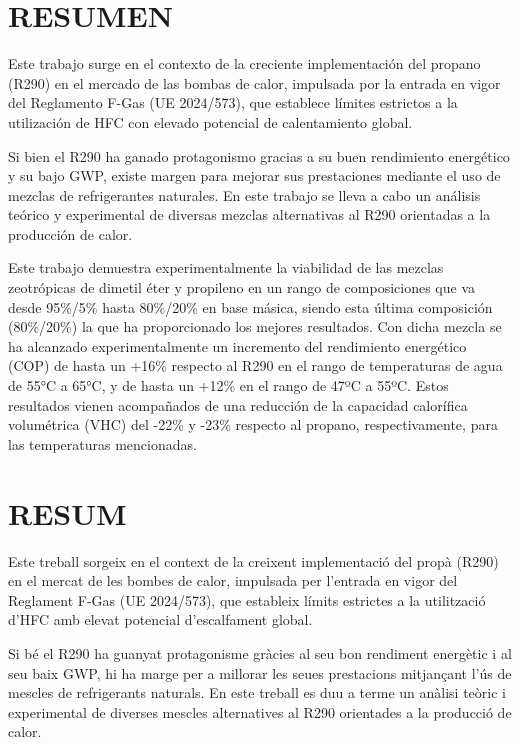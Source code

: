 \documentclass[../main.tex]{subfiles}
\begin{document}
\chapter*{RESUMEN}

Este trabajo surge en el contexto de la creciente implementación del propano (R290) en el mercado de las bombas de calor, impulsada por la entrada en vigor del Reglamento F-Gas (UE 2024/573), que establece límites estrictos a la utilización de HFC con elevado potencial de calentamiento global.

Si bien el R290 ha ganado protagonismo gracias a su buen rendimiento energético y su bajo GWP, existe margen para mejorar sus prestaciones mediante el uso de mezclas de refrigerantes naturales. En este trabajo se lleva a cabo un análisis teórico y experimental de diversas mezclas alternativas al R290 orientadas a la producción de calor.

Este trabajo demuestra experimentalmente la viabilidad de las mezclas zeotrópicas de dimetil éter y propileno en un rango de composiciones que va desde 95\%/5\% hasta 80\%/20\% en base másica, siendo esta última composición (80\%/20\%) la que ha proporcionado los mejores resultados. Con dicha mezcla se ha alcanzado experimentalmente un incremento del rendimiento energético (COP) de hasta un +16\% respecto al R290 en el rango de temperaturas de agua de 55°C a 65°C, y de hasta un +12\% en el rango de 47ºC a 55ºC. Estos resultados vienen acompañados de una reducción de la capacidad calorífica volumétrica (VHC) del -22\% y -23\% respecto al propano, respectivamente, para las temperaturas mencionadas.

\chapter*{RESUM}

Este treball sorgeix en el context de la creixent implementació del propà (R290) en el mercat de les bombes de calor, impulsada per l'entrada en vigor del Reglament F-Gas (UE 2024/573), que estableix límits estrictes a la utilització d'HFC amb elevat potencial d'escalfament global.

Si bé el R290 ha guanyat protagonisme gràcies al seu bon rendiment energètic i al seu baix GWP, hi ha marge per a millorar les seues prestacions mitjançant l'ús de mescles de refrigerants naturals. En este treball es duu a terme un anàlisi teòric i experimental de diverses mescles alternatives al R290 orientades a la producció de calor.
\end{document}
